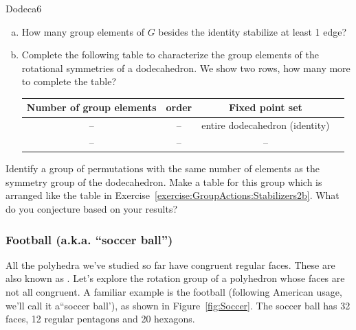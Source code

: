 \begin{exercise}{Dodeca6} 
\begin{enumerate}[(a)]
\item How many group elements of $G$ besides the identity stabilize at least 1 edge?
\item
Complete the following table to characterize the group elements of the rotational symmetries of a dodecahedron.  We show two rows, how many more to complete the table?  

\begin{tabular}{| c |c|c| r |} \hline
 \textbf{ Number of group elements} & \textbf{order} & \textbf{Fixed point set} \\ \hline
  --&  --& entire  dodecahedron (identity) \\ \hline
  -- & --&  -- \\ 
\end{tabular}
\end{enumerate}
\end{exercise}
\begin{exercise}{}

Identify a group of permutations with the same number of elements as the symmetry group of the dodecahedron. Make a table for this group which is arranged like the table in Exercise~\ref{exercise:GroupActions:Stabilizers2b}. What do you conjecture based on your results?
\end{exercise}

\subsubsection*{Football (a.k.a. ``soccer ball'')}
All the polyhedra we've studied so far have congruent regular faces.  These are also known as .  Let's explore the rotation group of a polyhedron whose faces are not all congruent.  A familiar example is the football (following 
American usage, we'll call it a``soccer ball'), as shown in  Figure~\ref{fig:Soccer}.  The soccer ball has 32 faces, 12 regular pentagons and 20 hexagons.  

